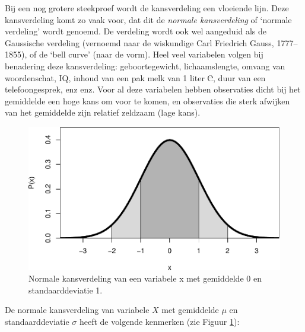 \documentclass[
]{book}
\begin{document}
Bij een nog grotere steekproef wordt de kansverdeling een vloeiende lijn.
Deze kansverdeling komt zo vaak voor, dat dit de \emph{normale kansverdeling}
of `normale verdeling' wordt genoemd. De verdeling wordt ook wel
aangeduid als de Gaussische verdeling (vernoemd naar de wiskundige Carl
Friedrich Gauss, 1777--1855), of de `bell curve' (naar de vorm). Heel
veel variabelen volgen bij benadering deze kansverdeling:
geboortegewicht, lichaamslengte, omvang van woordenschat, IQ, inhoud van
een pak melk van 1 liter ℮, duur van een telefoongesprek, enz enz. Voor
al deze variabelen hebben observaties dicht bij het gemiddelde een hoge
kans om voor te komen, en observaties die sterk afwijken van het
gemiddelde zijn relatief zeldzaam (lage kans).

\begin{figure}
\centering
\includegraphics{MS1NL-boek_files/figure-latex/normaalkansverdeling-1.pdf}
\caption{\label{fig:normaalkansverdeling}Normale kansverdeling van een variabele x met gemiddelde 0 en standaarddeviatie 1.}
\end{figure}

De normale kansverdeling van variabele \(X\) met gemiddelde \(\mu\) en
standaarddeviatie \(\sigma\) heeft de volgende kenmerken (zie
Figuur \ref{fig:normaalkansverdeling}):
\end{document}
